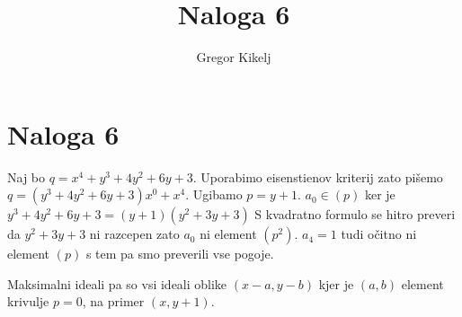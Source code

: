 \documentclass[12pt]{article}
\title{Naloga 6}
\author{Gregor Kikelj}
\begin{document}
\section{Naloga 6}
Naj bo $q=x^{4} + y^{3} + 4 y^{2} + 6 y + 3$. Uporabimo eisenstienov kriterij zato pišemo $q=(y^3+4y^2+6y+3)x^0+x^4$. Ugibamo $p=y+1$. $a_0\in (p)$ ker je 
$y^3+4y^2+6y+3=(y+1)(y^2+3y+3)$ S kvadratno formulo se hitro preveri da $y^2+3y+3$ ni razcepen zato $a_0$ ni element $(p^2)$. $a_4=1$ tudi očitno ni element $(p)$ s tem pa smo preverili
vse pogoje.

Maksimalni ideali pa so vsi ideali oblike $(x-a, y-b)$ kjer je $(a, b)$ element krivulje $p=0$, na primer $(x, y+1)$.
\end{document}
